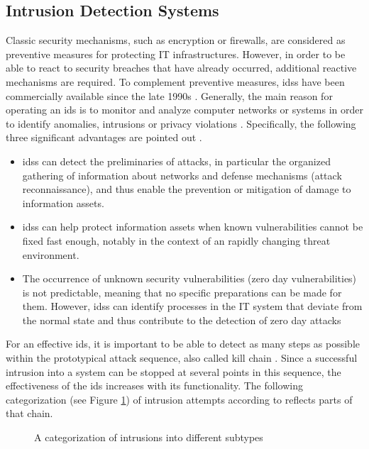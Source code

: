 \documentclass[../../../main.tex]{subfiles}
\begin{document}
\subsection{Intrusion Detection Systems} \label{subsec:intrusion_detection_systems}
Classic security mechanisms, such as encryption or firewalls, are considered as preventive measures for protecting IT infrastructures. However, in order to be able to react to security breaches that have already occurred, additional reactive mechanisms are required. To complement preventive measures, \glspl{ids} have been commercially available since the late 1990s \cite[27]{whitman_principles_2018}. Generally, the main reason for operating an \gls{ids} is to monitor and analyze computer networks or systems in order to identify anomalies, intrusions or privacy violations \cite{hindy2020taxonomy}. Specifically, the following three significant advantages are pointed out \cite[391]{whitman_principles_2018}.

\begin{itemize}
    \item \glspl{ids} can detect the preliminaries of attacks, in particular the organized gathering of information about networks and defense mechanisms (attack reconnaissance), and thus enable the prevention or mitigation of damage to information assets.
    \item \glspl{ids} can help protect information assets when known vulnerabilities cannot be fixed fast enough, notably in the context of an rapidly changing threat environment.
    \item The occurrence of unknown security vulnerabilities (zero day vulnerabilities) is not predictable, meaning that no specific preparations can be made for them. However, \glspl{ids} can identify processes in the IT system that deviate from the normal state and thus contribute to the detection of zero day attacks
\end{itemize}

For an effective \gls{ids}, it is important to be able to detect as many steps as possible within the prototypical attack sequence, also called kill chain \cite[393]{whitman_principles_2018}. Since a successful intrusion into a system can be stopped at several points in this sequence, the effectiveness of the \gls{ids} increases with its functionality. The following categorization (see Figure \ref{fig:intrusion-taxonomy}) of intrusion attempts according to \cite{kendall1999database} reflects parts of that chain.

\begin{figure}[t]
    \centering
    
    \caption{A categorization of intrusions into different subtypes}
    \label{fig:intrusion-taxonomy}
\end{figure}
\end{document}
